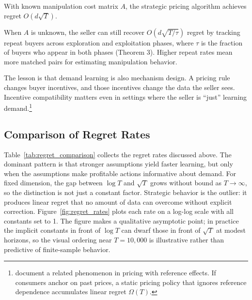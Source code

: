 \begin{theorem}
\label{thm:liu_fix}
With known manipulation cost matrix $A$, the strategic pricing algorithm achieves regret $O(d\sqrt{T})$.
\end{theorem}

When $A$ is unknown, the seller can still recover $O(d\sqrt{T/\tau})$ regret by tracking repeat buyers across exploration and exploitation phases, where $\tau$ is the fraction of buyers who appear in both phases (Theorem 3). Higher repeat rates mean more matched pairs for estimating manipulation behavior.

The lesson is that demand learning is also mechanism design. A pricing rule changes buyer incentives, and those incentives change the data the seller sees. Incentive compatibility matters even in settings where the seller is ``just'' learning demand.\footnote{\citet{Agrawal2024ref} document a related phenomenon in pricing with reference effects. If consumers anchor on past prices, a static pricing policy that ignores reference dependence accumulates linear regret $\Omega(T)$.}

\subsection{Comparison of Regret Rates}
\label{sec:comparison}

Table~\ref{tab:regret_comparison} collects the regret rates discussed above. The dominant pattern is that stronger assumptions yield faster learning, but only when the assumptions make profitable actions informative about demand. For fixed dimension, the gap between $\log T$ and $\sqrt{T}$ grows without bound as $T \to \infty$, so the distinction is not just a constant factor. Strategic behavior is the outlier: it produces linear regret that no amount of data can overcome without explicit correction. Figure~\ref{fig:regret_rates} plots each rate on a log-log scale with all constants set to 1. The figure makes a qualitative asymptotic point; in practice the implicit constants in front of $\log T$ can dwarf those in front of $\sqrt{T}$ at modest horizons, so the visual ordering near $T = 10{,}000$ is illustrative rather than predictive of finite-sample behavior.

